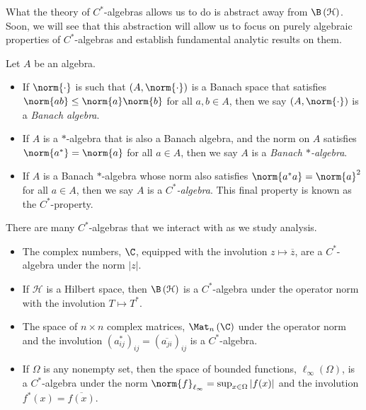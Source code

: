 What the theory of $C^{\ast}$-algebras allows us to do is abstract away from $\B\left( \mathcal{H} \right)$. Soon, we will see that this abstraction will allow us to focus on purely algebraic properties of $C^{\ast}$-algebras and establish fundamental analytic results on them.
\begin{definition}\label{def:banach_star_algebra}
  Let $A$ be an algebra.
  \begin{itemize}
    \item If $\norm{\cdot}$ is such that $\left( A,\norm{\cdot} \right)$ is a Banach space that satisfies $\norm{ab}\leq \norm{a}\norm{b}$ for all $a,b\in A$, then we say $\left( A,\norm{\cdot} \right)$ is a \textit{Banach algebra}.
    \item If $A$ is a $\ast$-algebra that is also a Banach algebra, and the norm on $A$ satisfies $\norm{a^{\ast}} = \norm{a}$ for all $a\in A$, then we say $A$ is a \textit{Banach $\ast$-algebra}.
    \item If $A$ is a Banach $\ast$-algebra whose norm also satisfies $\norm{a^{\ast}a} = \norm{a}^2$ for all $a\in A$, then we say $A$ is a \textit{$C^{\ast}$-algebra}. This final property is known as the $C^{\ast}$-property.
  \end{itemize}
\end{definition}
There are many $C^{\ast}$-algebras that we interact with as we study analysis.
\begin{example}\hfill
  \begin{itemize}
    \item The complex numbers, $\C$, equipped with the involution $z\mapsto \overline{z}$, are a $C^{\ast}$-algebra under the norm $\left\vert z \right\vert$.
    \item If $\mathcal{H}$ is a Hilbert space, then $\B\left( \mathcal{H} \right)$ is a $C^{\ast}$-algebra under the operator norm with the involution $T\mapsto T^{\ast}$.
    \item The space of $n\times n$ complex matrices, $\Mat_n\left( \C \right)$ under the operator norm and the involution $\left( a_{ij}^{\ast} \right)_{ij} = \left( \overline{a_{ji}} \right)_{ij}$ is a $C^{\ast}$-algebra.
    \item If $\Omega$ is any nonempty set, then the space of bounded functions, $\ell_{\infty}\left( \Omega \right)$, is a $C^{\ast}$-algebra under the norm $\norm{f}_{\ell_{\infty}} = \sup_{x\in\Omega}\left\vert f(x) \right\vert$ and the involution $f^{\ast}\left( x \right) = \overline{f(x)}$.
  \end{itemize}
\end{example}
